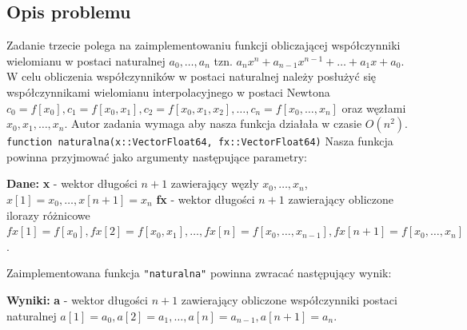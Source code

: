 \documentclass{article}
\begin{document}
\begin{center}
    \subsection{Opis problemu}
    \large Zadanie trzecie polega na zaimplementowaniu funkcji obliczającej współczynniki wielomianu w postaci naturalnej 
     \(a_{0},\dots,a_{n}\) tzn. \(a_{n}x^{n} + a_{n-1}x^{n-1} + \dots + a_{1}x + a_{0}\).
     W celu obliczenia współczynników w postaci naturalnej należy posłużyć się współczynnikami wielomianu interpolacyjnego w postaci Newtona 
     \(c_{0} = f[x_{0}], c_{1} = f[x_{0}, x_{1}], c_{2} = f[x_{0},x_{1},x_{2}],\dots,c_{n} = f[x_{0},\dots,x_{n}]\) oraz węzłami \(x_{0},x_{1},\dots,x_{n}\). \newline
     Autor zadania wymaga aby nasza funkcja działała w czasie \(O(n^{2})\). \newline 
     \texttt{function naturalna(x::Vector{Float64}, fx::Vector{Float64})} \newline 
     Nasza funkcja powinna przyjmować jako argumenty następujące parametry: \newline
     \begin{flushleft}
        \textbf{Dane:} \newline  
        \textbf{x} - wektor długości \(n + 1\) zawierający węzły \(x_{0}, \dots ,x_{n}\),   \(x[1] = x_{0},\dots,x[n+1]=x_{n}\) \newline
        \textbf{fx} - wektor długości \(n + 1\) zawierający obliczone ilorazy różnicowe \newline
        \(fx[1] = f[x_{0}], fx[2] = f[x_{0},x_{1}],\dots,fx[n] = f[x_{0},\dots,x_{n-1}], fx[n+1] = f[x_{0},\dots,x_{n}]\). \newline
     \end{flushleft}
     Zaimplementowana funkcja \texttt{"naturalna"} powinna zwracać następujący wynik: \newline
     \begin{flushleft}
        \textbf{Wyniki:} \newline  
        \textbf{a} - wektor długości \(n + 1\) zawierający obliczone współczynniki postaci naturalnej \newline
        \(a[1]=a_{0}, a[2]=a_{1},\dots,a[n]=a_{n-1}, a[n+1]=a_{n}\).
     \end{flushleft}

\end{center}
\end{document}
